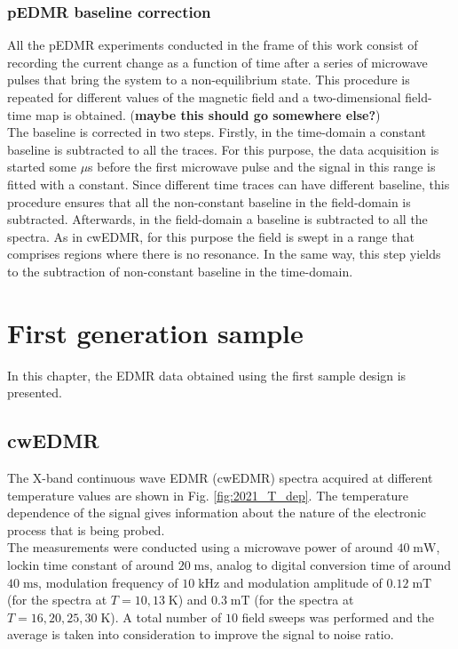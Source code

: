\documentclass[a4paper]{book}
\begin{document}
	\subsection{pEDMR baseline correction}
	All the pEDMR experiments conducted in the frame of this work consist of recording the current change as a function of time after a series of microwave pulses that bring the system to a non-equilibrium state. This procedure is repeated for different values of the magnetic field and a two-dimensional field-time map is obtained. (\textbf{maybe this should go somewhere else?})\\
	The baseline is corrected in two steps. Firstly, in the time-domain a constant baseline is subtracted to all the traces. For this purpose, the data acquisition is started some $\mu$s before the first microwave pulse and the signal in this range is fitted with a constant. Since different time traces can have different baseline, this procedure ensures that all the non-constant baseline in the field-domain is subtracted. Afterwards, in the field-domain a baseline is subtracted to all the spectra. As in cwEDMR, for this purpose the field is swept in a range that comprises regions where there is no resonance. In the same way, this step yields to the subtraction of non-constant baseline in the time-domain.\\
	
	
	\chapter{First generation sample}
	In this chapter, the EDMR data obtained using the first sample design is presented.
	
	\section{cwEDMR}
	The X-band continuous wave EDMR (cwEDMR) spectra acquired at different temperature values are shown in Fig. \ref{fig:2021_T_dep}. The temperature dependence of the signal gives information about the nature of the electronic process that is being probed.\\
	The measurements were conducted using a microwave power of around $40 \; \text{mW}$, lockin time constant of around $20 \; \text{ms}$, analog to digital conversion time of around $40 \; \text{ms}$, modulation frequency of $10 \; \text{kHz}$ and modulation amplitude of $0.12 \; \text{mT}$ (for the spectra at $T = 10, 13 \; \text{K}$) and $0.3 \; \text{mT}$ (for the spectra at $T = 16, 20, 25, 30 \; \text{K}$). A total number of $10$ field sweeps was performed and the average is taken into consideration to improve the signal to noise ratio.
	
\end{document}

